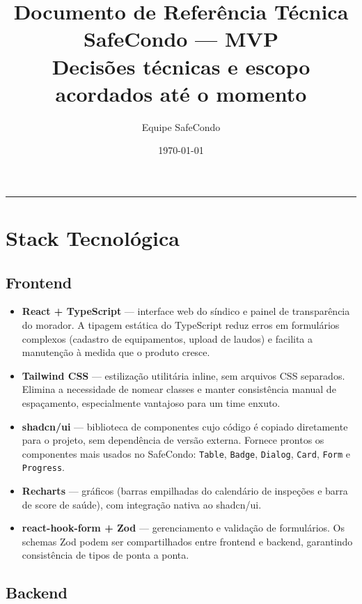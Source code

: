 \documentclass[12pt, a4paper]{article}
\title{
    \vspace{-1cm}
    {\large\color{accent} Documento de Referência Técnica} \\
    \vspace{0.3cm}
    {\LARGE\bfseries\color{primary} SafeCondo — MVP} \\
    \vspace{0.3cm}
    {\normalsize Decisões técnicas e escopo acordados até o momento}
}
\author{Equipe SafeCondo}
\date{\today}
\begin{document}
\maketitle
\vspace{0.5cm}
\hrule
\vspace{1cm}

\section{Stack Tecnológica}

\subsection{Frontend}

\begin{itemize}[leftmargin=1.5em]
    \item \textbf{React + TypeScript} — interface web do síndico e painel de transparência do morador.
    A tipagem estática do TypeScript reduz erros em formulários complexos (cadastro de equipamentos,
    upload de laudos) e facilita a manutenção à medida que o produto cresce.
    \item \textbf{Tailwind CSS} — estilização utilitária inline, sem arquivos CSS separados.
    Elimina a necessidade de nomear classes e manter consistência manual de espaçamento,
    especialmente vantajoso para um time enxuto.
    \item \textbf{shadcn/ui} — biblioteca de componentes cujo código é copiado diretamente
    para o projeto, sem dependência de versão externa. Fornece prontos os componentes mais
    usados no SafeCondo: \texttt{Table}, \texttt{Badge}, \texttt{Dialog}, \texttt{Card},
    \texttt{Form} e \texttt{Progress}.
    \item \textbf{Recharts} — gráficos (barras empilhadas do calendário de inspeções e
    barra de score de saúde), com integração nativa ao shadcn/ui.
    \item \textbf{react-hook-form + Zod} — gerenciamento e validação de formulários.
    Os schemas Zod podem ser compartilhados entre frontend e backend, garantindo
    consistência de tipos de ponta a ponta.
\end{itemize}

\subsection{Backend}
\end{document}
